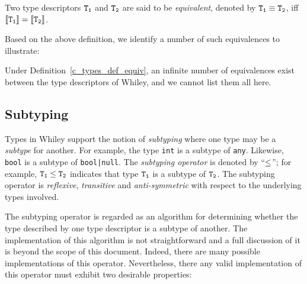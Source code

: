 \begin{definition}
\label{c_types_def_equiv}
Two type descriptors ${\tt T_1}$ and ${\tt T_2}$ are said to be {\em equivalent}, denoted by ${\tt T_1\equiv T_2}$, iff ${\tt \llbracket T_1\rrbracket = \llbracket T_2\rrbracket}$.
\end{definition}

\noindent Based on the above definition, we identify a number of such equivalences to illustrate:

Under Definition~\ref{c_types_def_equiv}, an infinite number of equivalences exist between the type descriptors of Whiley, and we cannot list them all here.

\subsection{Subtyping}
\label{c_types_subtyping}
Types in Whiley support the notion of {\em subtyping} where one type may be a {\em subtype} for another.  For example, the type \lstinline{int} is a subtype of \lstinline{any}.  Likewise, \lstinline{bool} is a subtype of \lstinline{bool|null}.  The {\em subtyping operator} is denoted by ``${\tt \le}$''; for example, ${\tt T_1\le T_2}$ indicates that type ${\tt T_1}$ is a subtype of ${\tt T_2}$.  The subtyping operator is {\em reflexive}, {\em transitive} and {\em anti-symmetric} with respect to the underlying types involved. 

The subtyping operator is regarded as an algorithm for determining whether the type described by one type descriptor is a subtype of another.  The implementation of this algorithm is not straightforward and a full discussion of it is beyond the scope of this document.  Indeed, there are many possible implementations of this operator.  Nevertheless, there any valid implementation of this operator must exhibit two desirable properties:

